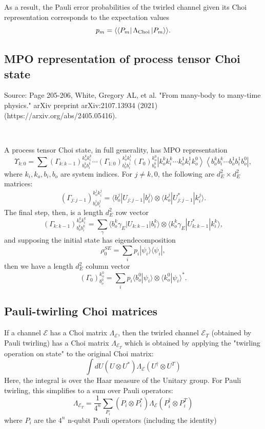 \documentclass{article}
\begin{document}
As a result, the Pauli error probabilities of the twirled channel given its Choi representation corresponds to the expectation values
\begin{equation}
    p_m = \langle\bra{P_m}\Lambda_\mathrm{Choi}\ket{P_m}\rangle.
\end{equation}

\subsection{MPO representation of process tensor Choi state}
Source: Page 205-206, White, Gregory AL, et al. "From many-body to many-time physics." arXiv preprint arXiv:2107.13934 (2021)(https://arxiv.org/abs/2405.05416).

\

\noindent A process tensor Choi state, in full generality, has MPO representation
$$
\Upsilon_{k:0} =
\sum
\left( \Gamma_{k:k-1} \right)^{k_o^k k_i^k}_{b_o^k b_i^k}
\cdots
\left( \Gamma_{1:0} \right)^{k_o^1 k_i^1}_{b_o^1 b_i^1}
\left( \Gamma_{0} \right)^{k_o^0}_{b_o^0}
\left| k_o^k k_i^k \cdots k_o^1 k_i^1 k_o^0 \right\rangle
\left\langle b_o^k b_i^k \cdots b_o^1 b_i^1 b_o^0 \right|,
$$
where $k_i, k_o, b_i, b_o$ are system indices. For $j\neq k, 0$, the following are $d^2_E\times d^2_E$ matrices:
$$
\left( \Gamma_{j:j-1} \right)^{k_o^j k_i^j}_{b_o^j b_i^j}
= 
\langle b_o^j | U_{j:j-1} | b_i^j \rangle 
\otimes 
\langle k_o^j | U_{j:j-1}^* | k_i^j \rangle.
$$
The final step, then, is a length $d^2_E$ row vector
$$
\left( \Gamma_{k:k-1} \right)^{k_o^k k_i^k}_{b_o^k b_i^k}
=
\sum_{\gamma}
\langle b_o^k \gamma_E | U_{k:k-1} | b_i^k \rangle 
\otimes 
\langle k_o^k \gamma_E | U_{k:k-1}^* | k_i^k \rangle,
$$
and supposing the initial state has eigendecomposition
$$
\rho_0^{SE} = \sum_i p_i |\psi_i\rangle\langle\psi_i |,
$$
then we have a length $d^2_E$ column vector
$$
(\Gamma_0)^{k_o^0}_{b_o^0} = \sum_i p_i \langle b_o^0 | \psi_i \rangle \otimes \langle k_o^0 | \psi_i \rangle ^* .
$$

\subsection{Pauli-twirling Choi matrices}
If a channel $\mathcal{E}$ has a Choi matrix $\Lambda_\mathcal{E}$, then the twirled channel $\mathcal{E}_T$ (obtained by Pauli twirling) has a Choi matrix $\Lambda_{\mathcal{E}_T}$ which is obtained by applying the "twirling operation on state" to the original Choi matrix:
$$
\int dU(U\otimes U^*) \Lambda_\mathcal{E} (U^\dagger \otimes U^T)
$$
Here, the integral is over the Haar measure of the Unitary group. For Pauli twirling, this simplifies to a sum over Pauli operators:
$$
\Lambda_{\mathcal{E}_T} = \frac{1}{4^n} \sum_{P_i}(P_i\otimes P_i^*) \Lambda_\mathcal{E} (P_i^\dagger \otimes P_i^T)
$$
where $P_i$ are the $4^n$ n-qubit Pauli operators (including the identity)
\end{document}
